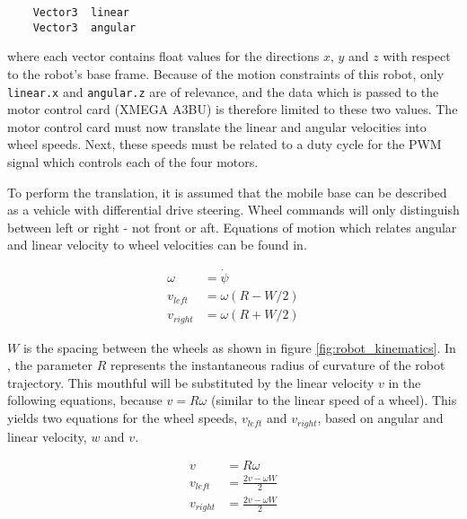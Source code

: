\begin{verbatim}
	Vector3  linear
	Vector3  angular
\end{verbatim}

where each vector contains float values for the directions $x$, $y$ and $z$ with respect to the robot's base frame. Because of the motion constraints of this robot, only \texttt{linear.x} and \texttt{angular.z} are of relevance, and the data which is passed to the motor control card (XMEGA A3BU) is therefore limited to these two values. The motor control card must now translate the linear and angular velocities into wheel speeds. Next, these speeds must be related to a duty cycle for the \ac{PWM} signal which controls each of the four motors.

To perform the translation, it is assumed that the mobile base can be described as a vehicle with differential drive steering. Wheel commands will only distinguish between left or right - not front or aft. Equations of motion which relates angular and linear velocity to wheel velocities can be found in\cite{cook2011mobile}. 

\begin{subequations}\label{eq:subeqns}
  	\begin{align}
	  	\omega &= \dot{\psi} \\
	   	v_{left} &= \omega (R - W/2)\\
	   	v_{right} &= \omega (R + W/2) \label{eq:subeq2}
   	\end{align}
\end{subequations}

$W$ is the spacing between the wheels as shown in figure \ref{fig:robot_kinematics}. In \cite{cook2011mobile}, the parameter $R$ represents the instantaneous radius of curvature of the robot trajectory. This mouthful will be substituted by the linear velocity $v$ in the following equations, because $v = R\omega$ (similar to the linear speed of a wheel). This yields two equations for the wheel speeds, $v_{left}$ and $v_{right}$, based on angular and linear velocity, $w$ and $v$.

 \begin{subequations}%
 	\begin{align}
 	v &= R\omega \\
 	v_{left} &=  \frac{2v - \omega W}{2}\\
 	v_{right} &= \frac{2v - \omega W}{2} %
 	\end{align}
 \end{subequations}



